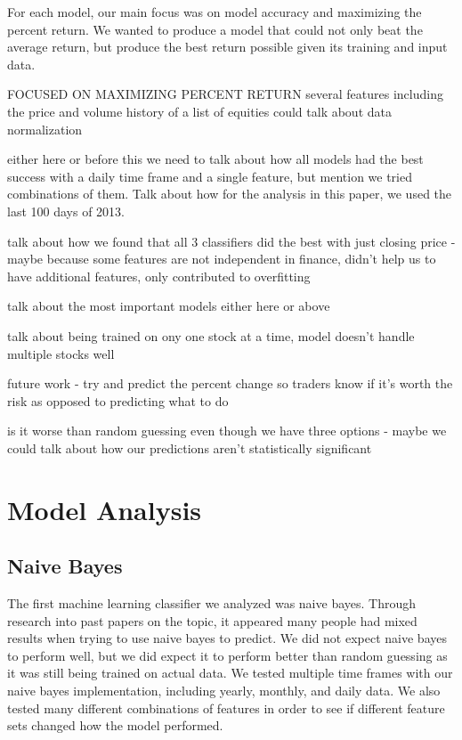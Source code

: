 \documentclass{article}
\begin{document}
For each model, our main focus was on model accuracy and maximizing the percent return. We wanted to produce a model that could not only beat the average return, but produce the best return possible given its training and input data.

FOCUSED ON MAXIMIZING PERCENT RETURN
several features including the price and volume history of a list of equities
could talk about data normalization

either here or before this we need to talk about how all models had the best success with a daily time frame and a single feature, but mention we tried combinations of them. Talk about how for the analysis in this paper, we used the last 100 days of 2013.

talk about how we found that all 3 classifiers did the best with just closing price - maybe because some features are not independent in finance, didn't help us to have additional features, only contributed to overfitting

talk about the most important models either here or above

talk about being trained on ony one stock at a time, model doesn't handle multiple stocks well

future work - try and predict the percent change so traders know if it's worth the risk as opposed to predicting what to do

is it worse than random guessing even though we have three options - maybe we could talk about how our predictions aren't statistically significant

\section{Model Analysis}

\subsection{Naive Bayes}
The first machine learning classifier we analyzed was naive bayes. Through research into past papers on the topic, it appeared many people had mixed results when trying to use naive bayes to predict. We did not expect naive bayes to perform well, but we did expect it to perform better than random guessing as it was still being trained on actual data. We tested multiple time frames with our naive bayes implementation, including yearly, monthly, and daily data. We also tested many different combinations of features in order to see if different feature sets changed how the model performed.
\end{document}
